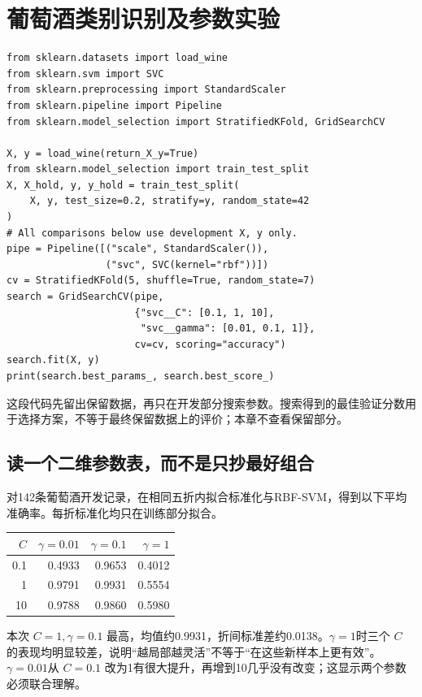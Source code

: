 \section{葡萄酒类别识别及参数实验}
\begin{lstlisting}[caption={Wine 中同时搜索核 SVM 的两个关键参数}]
from sklearn.datasets import load_wine
from sklearn.svm import SVC
from sklearn.preprocessing import StandardScaler
from sklearn.pipeline import Pipeline
from sklearn.model_selection import StratifiedKFold, GridSearchCV

X, y = load_wine(return_X_y=True)
from sklearn.model_selection import train_test_split
X, X_hold, y, y_hold = train_test_split(
    X, y, test_size=0.2, stratify=y, random_state=42
)
# All comparisons below use development X, y only.
pipe = Pipeline([("scale", StandardScaler()),
                 ("svc", SVC(kernel="rbf"))])
cv = StratifiedKFold(5, shuffle=True, random_state=7)
search = GridSearchCV(pipe,
                      {"svc__C": [0.1, 1, 10],
                       "svc__gamma": [0.01, 0.1, 1]},
                      cv=cv, scoring="accuracy")
search.fit(X, y)
print(search.best_params_, search.best_score_)
\end{lstlisting}

这段代码先留出保留数据，再只在开发部分搜索参数。搜索得到的最佳验证分数用于选择方案，不等于最终保留数据上的评价；本章不查看保留部分。

\subsection{读一个二维参数表，而不是只抄最好组合}
对142条葡萄酒开发记录，在相同五折内拟合标准化与RBF-SVM，得到以下平均准确率。每折标准化均只在训练部分拟合。
\begin{center}\small
\begin{tabular}{rrrr}\toprule
$C$&$\gamma=0.01$&$\gamma=0.1$&$\gamma=1$\\\midrule
0.1&0.4933&0.9653&0.4012\\
1&0.9791&0.9931&0.5554\\
10&0.9788&0.9860&0.5980\\\bottomrule
\end{tabular}\end{center}

本次 $C=1,\gamma=0.1$ 最高，均值约0.9931，折间标准差约0.0138。$\gamma=1$时三个 $C$ 的表现均明显较差，说明“越局部越灵活”不等于“在这些新样本上更有效”。$\gamma=0.01$从 $C=0.1$ 改为1有很大提升，再增到10几乎没有改变；这显示两个参数必须联合理解。

